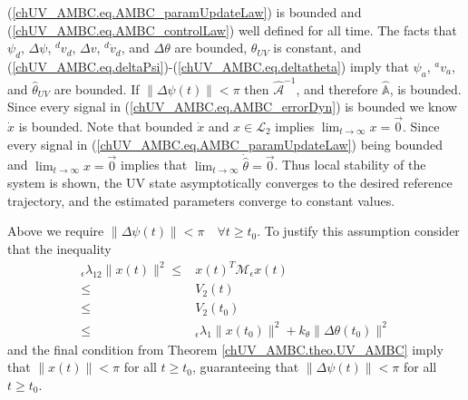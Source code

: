 (\ref{chUV_AMBC.eq.AMBC_paramUpdateLaw}) is bounded and
(\ref{chUV_AMBC.eq.AMBC_controlLaw})  well defined for all time.
%
The facts that $\psi_d$, $\Delta \psi$, ${^d}v_d$, $\Delta v$,
${^d}\dot{v}_d$, and $\Delta \theta$ are bounded, $\theta_{UV}$ is
constant, and
(\ref{chUV_AMBC.eq.deltaPsi})-(\ref{chUV_AMBC.eq.deltatheta}) imply
that $\psi_a$, ${^a}v_a$, and $\hat{\theta}_{UV}$ are bounded.
%
If $\|\Delta\psi(t)\|<\pi$ then $\hat{\mathcal{A}}^{-1}$, and therefore $\hat{\mathbb{A}}$, is bounded.
%
Since every signal in (\ref{chUV_AMBC.eq.AMBC_errorDyn}) is bounded we
know $\dot{x}$ is bounded. Note that bounded $\dot{x}$ and $x \in
\mathcal{L}_2$ implies $\lim_{t\to \infty} x=\vec{0}$.  Since every
signal in (\ref{chUV_AMBC.eq.AMBC_paramUpdateLaw}) being bounded and
$\lim_{t\to \infty} x=\vec{0}$ implies that $\lim_{t\to
  \infty}\dot{\hat{\theta}}=\vec{0}$.  Thus local stability of the
system is shown, the \ac{UV} state asymptotically converges to the
desired reference trajectory, and the estimated parameters converge to
constant values.



Above we require $\|\Delta\psi(t)\|<\pi\quad\forall t \geq t_0$.  To
justify this assumption consider that the inequality
%
\begin{align}
{_\epsilon}\lambda_{12}\|x(t)\|^2
    \leq&x(t)^T \mathcal{M}_\epsilon x(t)
\nonumber \\
    \leq&V_2(t)
\nonumber \\
    \leq&V_2(t_0)
\nonumber \\
     \leq & {_\epsilon}\lambda_1\|x(t_0)\|^2+
      k_\theta\|\Delta \theta(t_0)\|^2
\end{align}
%
\noindent and the final condition from Theorem
\ref{chUV_AMBC.theo.UV_AMBC} imply that $\|x(t)\|<\pi$ for all $t\geq
t_0$, guaranteeing that $\|\Delta \psi(t)\|<\pi$ for all $t\geq t_0$.




